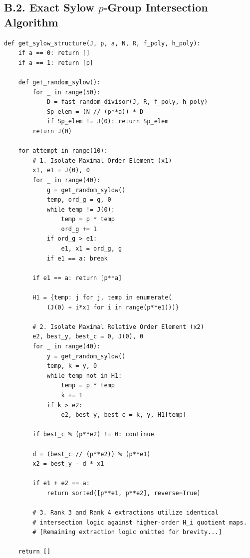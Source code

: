 \documentclass[letterpaper, 11pt]{article}
\begin{document}
\subsection{B.2. Exact Sylow \texorpdfstring{$p$}{p}-Group Intersection Algorithm}
\begin{lstlisting}
def get_sylow_structure(J, p, a, N, R, f_poly, h_poly):
    if a == 0: return []
    if a == 1: return [p]
    
    def get_random_sylow():
        for _ in range(50):
            D = fast_random_divisor(J, R, f_poly, h_poly)
            Sp_elem = (N // (p**a)) * D
            if Sp_elem != J(0): return Sp_elem
        return J(0)
        
    for attempt in range(10): 
        # 1. Isolate Maximal Order Element (x1)
        x1, e1 = J(0), 0
        for _ in range(40):
            g = get_random_sylow()
            temp, ord_g = g, 0
            while temp != J(0):
                temp = p * temp
                ord_g += 1
            if ord_g > e1:
                e1, x1 = ord_g, g
            if e1 == a: break
        
        if e1 == a: return [p**a]
        
        H1 = {temp: j for j, temp in enumerate(
            (J(0) + i*x1 for i in range(p**e1)))}
            
        # 2. Isolate Maximal Relative Order Element (x2)
        e2, best_y, best_c = 0, J(0), 0
        for _ in range(40):
            y = get_random_sylow()
            temp, k = y, 0
            while temp not in H1:
                temp = p * temp
                k += 1
            if k > e2:
                e2, best_y, best_c = k, y, H1[temp]
                
        if best_c % (p**e2) != 0: continue 
            
        d = (best_c // (p**e2)) % (p**e1)
        x2 = best_y - d * x1
        
        if e1 + e2 == a:
            return sorted([p**e1, p**e2], reverse=True)
            
        # 3. Rank 3 and Rank 4 extractions utilize identical 
        # intersection logic against higher-order H_i quotient maps.
        # [Remaining extraction logic omitted for brevity...]
        
    return []
\end{lstlisting}
\end{document}
